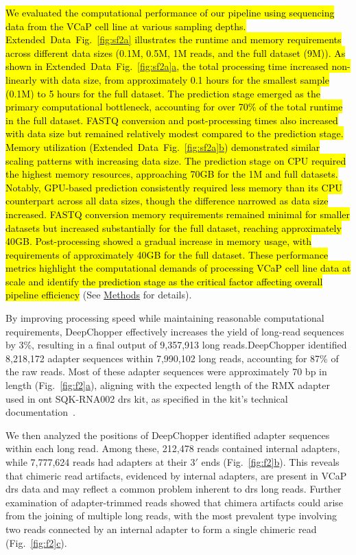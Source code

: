 \documentclass[pdflatex,sn-nature, lineno]{sn-jnl}%
\newcommand{\figref}[2]{Fig.~\hyperref[#1]{\ref*{#1}#2}}
\newcommand{\edfigref}[2]{Extended Data Fig.~\hyperref[#1]{\ref*{#1}#2}}
\begin{document}
\hl{We evaluated the computational performance of our pipeline using sequencing data from the VCaP cell line at various sampling depths.
    \mbox{\edfigref{fig:sf2a}{}} illustrates the runtime and memory requirements across different data sizes (0.1M, 0.5M, 1M reads, and the full dataset (9M)).
    As shown in \mbox{\edfigref{fig:sf2a}{a}}, the total processing time increased non-linearly with data size, from approximately 0.1 hours for the smallest sample (0.1M) to 5 hours for the full dataset.
    The prediction stage emerged as the primary computational bottleneck, accounting for over 70\% of the total runtime in the full dataset.
    FASTQ conversion and post-processing times also increased with data size but remained relatively modest compared to the prediction stage.
    Memory utilization (\mbox{\edfigref{fig:sf2a}{b}}) demonstrated similar scaling patterns with increasing data size.
    The prediction stage on CPU required the highest memory resources, approaching 70GB for the 1M and full datasets.
    Notably, GPU-based prediction consistently required less memory than its CPU counterpart across all data sizes, though the difference narrowed as data size increased.
    FASTQ conversion memory requirements remained minimal for smaller datasets but increased substantially for the full dataset, reaching approximately 40GB.
    Post-processing showed a gradual increase in memory usage, with requirements of approximately 40GB for the full dataset.
    These performance metrics highlight the computational demands of processing VCaP cell line data at scale and identify the prediction stage as the critical factor affecting overall pipeline efficiency} (See \hyperref[sec:methods]{Methods} for details).

By improving processing speed while maintaining reasonable computational requirements, DeepChopper effectively increases the yield of long-read sequences by 3\%, resulting in a final output of 9,357,913 long reads.DeepChopper identified 8,218,172 adapter sequences within 7,990,102 long reads, accounting for 87\% of the raw reads.
Most of these adapter sequences were approximately 70 bp in length (\figref{fig:f2}{a}), aligning with the expected length of the RMX adapter used in \gls{ont} SQK-RNA002 \gls{drs} kit, as specified in the kit's technical documentation~\cite{nano2017tech}.

We then analyzed the positions of DeepChopper identified adapter sequences within each long read.
Among these, 212,478 reads contained internal adapters, while 7,777,624 reads had adapters at their $3'$ ends (\figref{fig:f2}{b}).
This reveals that chimeric read artifacts, evidenced by internal adapters, are present in VCaP \gls{drs} data and may reflect a common problem inherent to \gls{drs} long reads.
Further examination of adapter-trimmed reads showed that chimera artifacts could arise from the joining of multiple long reads, with the most prevalent type involving two reads connected by an internal adapter to form a single chimeric read (\figref{fig:f2}{c}).
\end{document}
